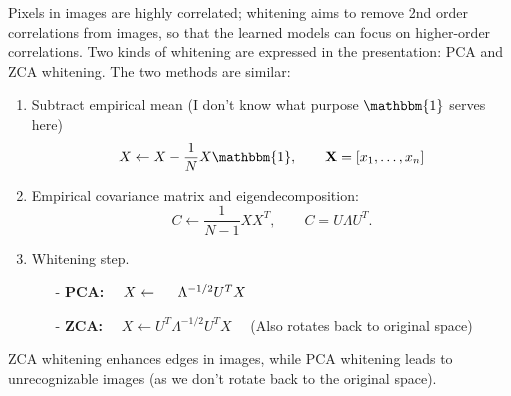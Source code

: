 \documentclass[a4paper]{article}
\begin{document}
Pixels in images are highly correlated; whitening aims to remove 2nd order correlations from images, so that the learned models can focus on higher-order correlations. Two kinds of whitening are expressed in the presentation: PCA and ZCA whitening. The two methods are similar:

\begin{enumerate}
\item Subtract empirical mean (I don't know what purpose $\mathbbm{1}$ serves here)
$$X \leftarrow X - \frac{1}{N} X\mathbbm{1}, \qquad \mathbf{X} = [x_1,\ldots,x_n]$$

\item Empirical covariance matrix and eigendecomposition:
$$C \leftarrow \frac{1}{N-1} XX^T, \qquad C = U \Lambda U^T.$$

\item Whitening step.
\begin{itemize}
\item[-] \textbf{PCA:} $\quad X \leftarrow \hspace{5mm} \Lambda^{-1/2} U^T X$
\item[-] \textbf{ZCA:} $\quad X \leftarrow U^T \Lambda^{-1/2} U^T X \quad$ (Also rotates back to original space)
\end{itemize}
\end{enumerate}
ZCA whitening enhances edges in images, while PCA whitening leads to unrecognizable images (as we don't rotate back to the original space).
\end{document}
